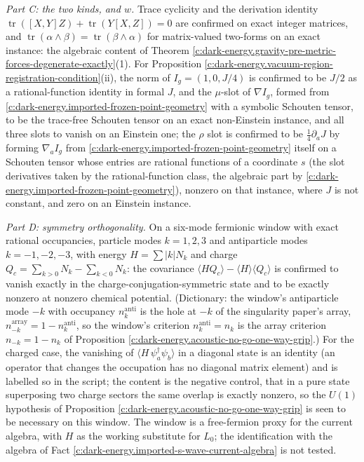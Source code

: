 \documentclass[11pt]{article}
\theoremstyle{definition}
\theoremstyle{plain}
\begin{document}
\emph{Part C: the two kinds, and $w$.} Trace cyclicity and the derivation identity $\operatorname{tr}([X,Y]Z) + \operatorname{tr}(Y[X,Z]) = 0$ are confirmed on exact integer matrices, and $\operatorname{tr}(\alpha\wedge\beta) = \operatorname{tr}(\beta\wedge\alpha)$ for matrix-valued two-forms on an exact instance: the algebraic content of Theorem \ref{c:dark-energy.gravity-pre-metric-forces-degenerate-exactly}(1). For Proposition \ref{c:dark-energy.vacuum-region-registration-condition}(ii), the norm of $I_g = (1, 0, J/4)$ is confirmed to be $J/2$ as a rational-function identity in formal $J$, and the $\mu$-slot of $\nabla I_g$, formed from \ref{c:dark-energy.imported-frozen-point-geometry} with a symbolic Schouten tensor, to be the trace-free Schouten tensor on an exact non-Einstein instance, and all three slots to vanish on an Einstein one; the $\rho$ slot is confirmed to be $\tfrac14\partial_aJ$ by forming $\nabla_a I_g$ from \ref{c:dark-energy.imported-frozen-point-geometry} itself on a Schouten tensor whose entries are rational functions of a coordinate $s$ (the slot derivatives taken by the rational-function class, the algebraic part by \ref{c:dark-energy.imported-frozen-point-geometry}), nonzero on that instance, where $J$ is not constant, and zero on an Einstein instance.

\emph{Part D: symmetry orthogonality.} On a six-mode fermionic window with exact rational occupancies, particle modes $k = 1,2,3$ and antiparticle modes $k = -1,-2,-3$, with energy $H = \sum |k| N_k$ and charge $Q_c = \sum_{k>0}N_k - \sum_{k<0}N_k$: the covariance $\langle HQ_c\rangle - \langle H\rangle\langle Q_c\rangle$ is confirmed to vanish exactly in the charge-conjugation-symmetric state and to be exactly nonzero at nonzero chemical potential. (Dictionary: the window's antiparticle mode $-k$ with occupancy $n^{\mathrm{anti}}_{k}$ is the hole at $-k$ of the singularity paper's array, $n^{\mathrm{array}}_{-k} = 1 - n^{\mathrm{anti}}_k$, so the window's criterion $n^{\mathrm{anti}}_k = n_k$ is the array criterion $n_{-k} = 1 - n_k$ of Proposition \ref{c:dark-energy.acoustic-no-go-one-way-grip}.) For the charged case, the vanishing of $\langle H\,\psi^\dagger_a\psi_b\rangle$ in a diagonal state is an identity (an operator that changes the occupation has no diagonal matrix element) and is labelled so in the script; the content is the negative control, that in a pure state superposing two charge sectors the same overlap is exactly nonzero, so the $U(1)$ hypothesis of Proposition \ref{c:dark-energy.acoustic-no-go-one-way-grip} is seen to be necessary on this window. The window is a free-fermion proxy for the current algebra, with $H$ as the working substitute for $L_0$; the identification with the algebra of Fact \ref{c:dark-energy.imported-s-wave-current-algebra} is not tested.
\end{document}
